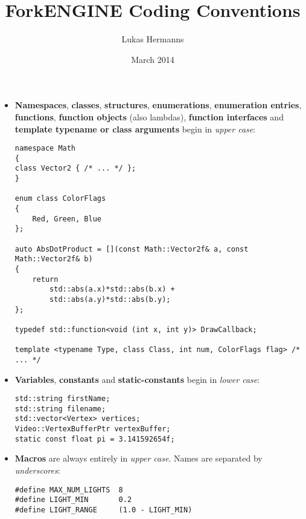 \documentclass{article}
\title{ForkENGINE Coding Conventions}
\author{Lukas Hermanns}
\date{March 2014}
\begin{document}


\maketitle
\begin{itemize}

\item
\textbf{Namespaces}, \textbf{classes}, \textbf{structures}, \textbf{enumerations}, \textbf{enumeration entries}, \textbf{functions},
\textbf{function objects} (also lambdas), \textbf{function interfaces} and \textbf{template typename or class arguments} begin in \textit{upper case}:

\begin{lstlisting}
namespace Math
{
class Vector2 { /* ... */ };
}

enum class ColorFlags
{
	Red, Green, Blue
};

auto AbsDotProduct = [](const Math::Vector2f& a, const Math::Vector2f& b)
{
	return
		std::abs(a.x)*std::abs(b.x) +
		std::abs(a.y)*std::abs(b.y);
};

typedef std::function<void (int x, int y)> DrawCallback;

template <typename Type, class Class, int num, ColorFlags flag> /* ... */
\end{lstlisting}

\item
\textbf{Variables}, \textbf{constants} and \textbf{static-constants} begin in \textit{lower case}:

\begin{lstlisting}
std::string firstName;
std::string filename;
std::vector<Vertex> vertices;
Video::VertexBufferPtr vertexBuffer;
static const float pi = 3.141592654f;
\end{lstlisting}

\item
\textbf{Macros} are always entirely in \textit{upper case}. Names are separated by \textit{underscores}:

\begin{lstlisting}
#define MAX_NUM_LIGHTS  8
#define LIGHT_MIN       0.2
#define LIGHT_RANGE     (1.0 - LIGHT_MIN)
\end{lstlisting}


\end{itemize}
\end{document}
